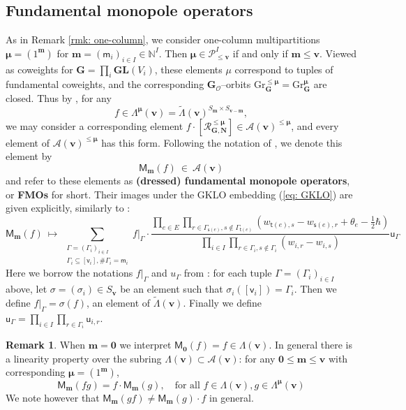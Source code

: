 \documentclass[11pt,reqno]{amsart}
\renewcommand{\mathbf}{\mathbold}
\numberwithin{equation}{section}
\theoremstyle{definition}
\newtheorem{Remark}[equation]{Remark}
\newcommand{\cA}{\mathcal{A}}
\newcommand{\bG}{\mathbf{G}}
\newcommand{\bN}{\mathbf{N}}
\newcommand{\cO}{\mathcal{O}}
\newcommand{\cP}{\mathcal{P}}
\newcommand{\cR}{\mathcal{R}}
\newcommand{\bm}{\mathbf{m}}
\newcommand{\bv}{\mathbf{v}}
\newcommand{\NN}{\mathbb{N}}
\newcommand{\GL}{\mathbf{GL}}
\newcommand{\Gr}{\mathrm{Gr}}
\renewcommand{\bv}{\mathbf{v}} %
\newcommand{\sv}{\mathsf{v}}
\newcommand{\sm}{\mathsf{m}}
\newcommand{\M}{\mathsf{M}}
\newcommand{\sfu}{\mathsf{u}}
\newcommand{\source}{\mathsf{s}}
\newcommand{\target}{\mathsf{t}}
\newcommand{\vertexset}{I}
\newcommand{\arrowset}{E}
\newcommand{\GT}{\Lambda}
\newcommand{\tGT}{\widetilde{\Lambda}}
\newcommand{\Partitions}{\cP}
\newcommand{\bmu}{{\boldsymbol{\mu}}}
\newcommand{\qzast}{\cA}
\begin{document}
\subsection{Fundamental monopole operators}
As in Remark \ref{rmk: one-column}, we consider {one-column multipartitions}  $\bmu = (1^{\bm})$ for $\bm = (\sm_i)_{i \in \vertexset} \in \NN^\vertexset$. Then $\bmu \in \Partitions^{\vertexset}_{\leq \bv}$ if and only if $\bm \leq \bv$. Viewed as coweights for $\bG = \prod_{i} \GL(V_i)$,  these elements $\mu$ correspond to tuples of fundamental coweights, and the corresponding $\bG_\cO$--orbits $\Gr_\bG^{\leq \bmu} = \Gr_\bG^{\bmu}$ are closed. Thus by \cite[\S 6(ii)]{BFN1}, for any 
$$
f \in \GT^{\bmu}(\bv) =  \tGT(\bv)^{S_{\bm} \times S_{\bv-\bm}},
$$
we may consider a corresponding element $f \cdot [ \cR_{\bG,\bN}^{\leq \bmu}] \in \qzast(\bv)^{\leq \bmu}$, and every element of $\qzast(\bv)^{\leq \bmu}$ has this form.  Following the notation of \cite{MW2}, we denote this element by 
\begin{equation}
\M_\bm(f) \ \in \ \qzast(\bv)
\end{equation}
and refer to these elements as \textbf{(dressed) fundamental monopole operators}, or \textbf{FMOs} for short. Their images under the GKLO embedding (\ref{eq: GKLO}) are given explicitly, similarly to \cite[\S A(ii)]{BFN2}:
\begin{equation}
\label{eq: FMOs under GKLO}
\M_\bm(f) \ \mapsto \ \sum_{\substack{\Gamma = (\Gamma_i)_{i \in I} \\ \Gamma_i \subseteq [\sv_i],  \# \Gamma_i = \sm_i}} f\vert_\Gamma \cdot  \frac{\prod_{ e \in \arrowset} \prod_{r\in \Gamma_{\source(e)}, s\notin \Gamma_{\target(e)}} (w_{\target(e),s} - w_{\source(e),r}+\theta_e - \tfrac{1}{2} \hbar)}{\prod_{i \in I} \prod_{r \in \Gamma_i, s\notin \Gamma_i}(w_{i,r} - w_{i,s})}  \sfu_{\Gamma} 
\end{equation}
Here we borrow the notations $f|_\Gamma$ and $u_\Gamma$ from  \cite{MW2}: for each tuple $\Gamma = (\Gamma_i)_{i \in I}$ above, let $\sigma = (\sigma_i) \in S_\bv$ be an element such that $\sigma_i([\sv_i]) = \Gamma_i$. Then we define $f|_\Gamma = \sigma(f)$, an element of $\tGT(\bv)$.  Finally we define $\sfu_\Gamma = \prod_{i \in I} \prod_{r \in \Gamma_i} \sfu_{i,r}$.
\begin{Remark}
When $\bm = \mathbf{0}$ we interpret $\M_\mathbf{0}(f) = f \in \GT(\bv)$. In general there is a linearity property over the subring $\GT(\bv) \subset \qzast(\bv)$: for any $\mathbf{0} \leq \bm \leq \bv$ with corresponding $\bmu = (1^{\bm})$,
$$
\M_\bm(fg ) = f \cdot \M_\bm(g), \quad \text{for all } f\in \GT(\bv), g \in \GT^{\bmu}(\bv)
$$
We note however that $\M_\bm(gf) \neq \M_\bm(g) \cdot f$ in general.
\end{Remark}
\end{document}
